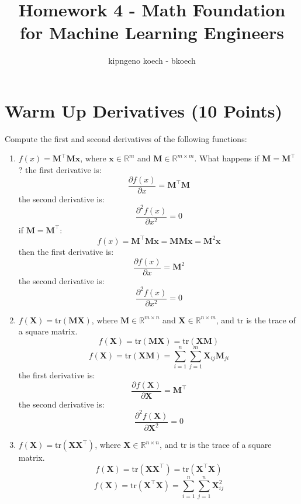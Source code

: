 \documentclass{article}
\begin{document}
\author{kipngeno koech - bkoech}
\title{Homework 4 - Math Foundation for Machine Learning Engineers}   
\maketitle

\medskip


\section{Warm Up Derivatives (10 Points)}
Compute the first and second derivatives of the following functions:
\begin{enumerate}
    \item $f(x) = \mathbf{M}^\top \mathbf{M} \mathbf{x}$, where $\mathbf{x} \in \mathbb{R}^m$ and $\mathbf{M} \in \mathbb{R}^{m \times m}$. What happens if $\mathbf{M} = \mathbf{M}^\top$?
    the first derivative is:
    \[
    \frac{\partial f(x)}{\partial x} = \mathbf{M}^\top \mathbf{M}
    \]
    the second derivative is:
    \[
    \frac{\partial^2 f(x)}{\partial x^2} = 0
    \]
    if $\mathbf{M} = \mathbf{M}^\top$:
    \[
    f(x) = \mathbf{M}^\top \mathbf{M} \mathbf{x} = \mathbf{M} \mathbf{M} \mathbf{x} = \mathbf{M}^2 \mathbf{x}
    \]
    then the first derivative is:
    \[
    \frac{\partial f(x)}{\partial x} = \mathbf{M}^2
    \]
    the second derivative is:
    \[
    \frac{\partial^2 f(x)}{\partial x^2} = 0
    \]
    \item $f(\mathbf{X}) = \text{tr}(\mathbf{M}\mathbf{X})$, where $\mathbf{M} \in \mathbb{R}^{m \times n}$ and $\mathbf{X} \in \mathbb{R}^{n \times m}$, and $\text{tr}$ is the trace of a square matrix.
    \[
    f(\mathbf{X}) = \text{tr}(\mathbf{M}\mathbf{X}) = \text{tr}(\mathbf{X}\mathbf{M})
    \]
    \[
    f(\mathbf{X}) = \text{tr}(\mathbf{X}\mathbf{M}) = \sum_{i=1}^{n} \sum_{j=1}^{m} \mathbf{X}_{ij} \mathbf{M}_{ji}
    \]
    the first derivative is:
    \[
    \frac{\partial f(\mathbf{X})}{\partial \mathbf{X}} = \mathbf{M}^\top
    \]
    the second derivative is:
    \[
    \frac{\partial^2 f(\mathbf{X})}{\partial \mathbf{X}^2} = 0
    \]
    \item $f(\mathbf{X}) = \text{tr}(\mathbf{X} \mathbf{X}^\top)$, where $\mathbf{X} \in \mathbb{R}^{n \times n}$, and $\text{tr}$ is the trace of a square matrix.
    \[
    f(\mathbf{X}) = \text{tr}(\mathbf{X} \mathbf{X}^\top) = \text{tr}(\mathbf{X}^\top \mathbf{X})
    \]
    \[
    f(\mathbf{X}) = \text{tr}(\mathbf{X}^\top \mathbf{X}) = \sum_{i=1}^{n} \sum_{j=1}^{n} \mathbf{X}_{ij}^2
\]
\end{enumerate}
\end{document}
